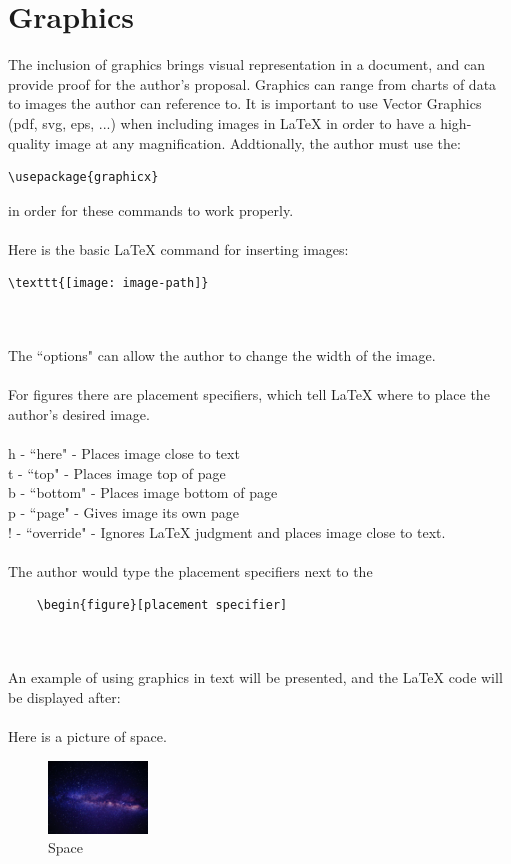 \documentclass[11pt,twocolumn]{article}
\begin{document}
\section {Graphics}
The inclusion of graphics brings visual representation in a document, and can provide proof for the author's proposal. Graphics can range from charts of data to images the author can reference to. It is important to use Vector Graphics (pdf, svg, eps, ...) when including images in {\LaTeX} in order to have a high-quality image at any magnification. Addtionally, the author must use the:
\begin{verbatim}
\usepackage{graphicx}
\end{verbatim}
in order for these commands to work properly.
\\
\\
Here is the basic {\LaTeX} command for inserting images:
\begin{verbatim}
\texttt{[image: image-path]} 
\end{verbatim}
\\
\\
The ``options" can allow the author to change the width of the image.
\\
\\
For figures there are placement specifiers, which tell {\LaTeX} where to place the author's desired image.
\\
\\
h - ``here" - Places image close to text
\\
t - ``top" - Places image top of page
\\
b - ``bottom" - Places image bottom of page
\\
p - ``page" - Gives image its own page
\\
! - ``override" - Ignores {\LaTeX} judgment and places image close to text.
\\
\\
The author would type the placement specifiers next to the 
\begin{verbatim}
    \begin{figure}[placement specifier]
\end{verbatim}
\\
\\
An example of using graphics in text will be presented, and the {\LaTeX} code will be displayed after:
\\
\\
Here is a picture of space.  
\begin{figure}[h]
\centering
\includegraphics[width=100px]{space} 
\caption{Space}
\end{figure}
\end{document}

